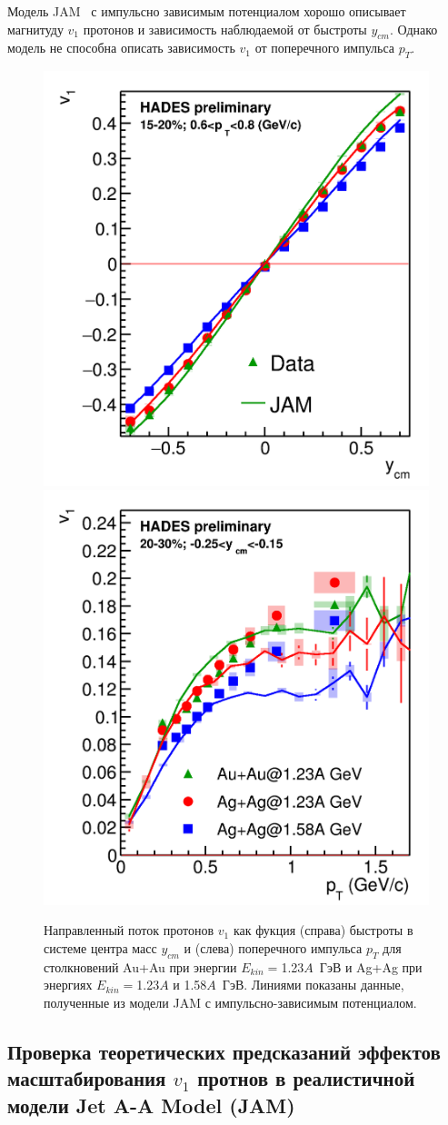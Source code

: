 Модель JAM~\cite{nara2019jam} с импульсно зависимым потенциалом хорошо описывает магнитуду $v_1$ протонов и зависимость наблюдаемой от быстроты $y_{cm}$.
Однако модель не способна описать зависимость $v_1$ от поперечного импульса $p_T$.
%
\begin{figure}[ht]
\begin{center}
\includegraphics[width=0.45\linewidth]{images/v1_hades_ycm.png}
\includegraphics[width=0.45\linewidth]{images/v1_hades_pT.png}
\caption{Направленный поток протонов $v_1$ как фукция (справа) быстроты в системе центра масс $y_{cm}$ и (слева) поперечного импульса $p_T$ для столкновений Au+Au при энергии $E_{kin}=$1.23$A$~ГэВ и Ag+Ag при энергиях $E_{kin}=$1.23$A$ и 1.58$A$~ГэВ. Линиями показаны данные, полученные из модели JAM с импульсно-зависимым потенциалом.}
\label{fig:hades_v1_ycm_pT}
\end{center}
\end{figure}

\subsection{Проверка теоретических предсказаний эффектов масштабирования $v_1$ протнов в реалистичной модели Jet A-A Model (JAM)}

